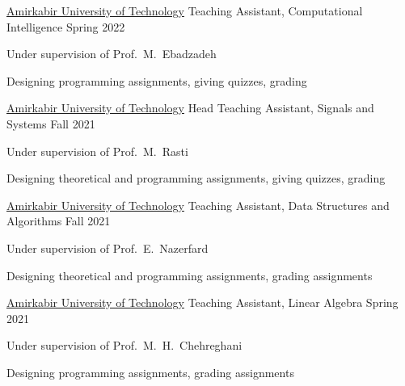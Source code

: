 \begin{cventries}
  \cventry
    {\href{https://aut.ac.ir/}{Amirkabir University of Technology}} %
    {Teaching Assistant, Computational Intelligence} %
    {} %
    {Spring 2022} %
    {
      \begin{cvitems} %
        \item {Under supervision of Prof.~M.~Ebadzadeh}
        \item {Designing programming assignments, giving quizzes, grading}
      \end{cvitems}
    }
    
  \cventry
    {\href{https://aut.ac.ir/}{Amirkabir University of Technology}} %
    {Head Teaching Assistant, Signals and Systems} %
    {} %
    {Fall 2021} %
    {
      \begin{cvitems} %
        \item {Under supervision of Prof.~M.~Rasti}
        \item {Designing theoretical and programming assignments, giving quizzes, grading}
      \end{cvitems}
    }
   
  \cventry
    {\href{https://aut.ac.ir/}{Amirkabir University of Technology}} %
    {Teaching Assistant, Data Structures and Algorithms} %
    {} %
    {Fall 2021} %
    {
      \begin{cvitems} %
        \item {Under supervision of Prof.~E.~Nazerfard}
        \item {Designing theoretical and programming assignments, grading assignments}
      \end{cvitems}
    }

  \cventry
    {\href{https://aut.ac.ir/}{Amirkabir University of Technology}} %
    {Teaching Assistant, Linear Algebra} %
    {} %
    {Spring 2021} %
    {
      \begin{cvitems} %
        \item {Under supervision of Prof.~M.~H.~Chehreghani}
        \item {Designing programming assignments, grading assignments}
      \end{cvitems}
    }


\end{cventries}
